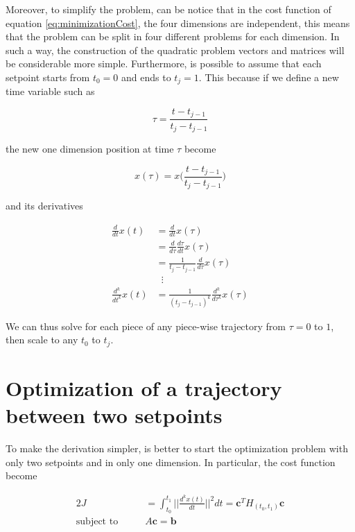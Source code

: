 \noindent Moreover, to simplify the problem, can be notice that in the cost function of equation \eqref{eq:minimizationCost}, the four dimensions are independent, this means that the problem can be split in four different problems for each dimension. In such a way, the construction of the quadratic problem vectors and matrices will be considerable more simple. Furthermore, is possible to assume that each setpoint starts from $t_0=0$ and ends to $t_j=1$. This because if we define a new time variable such as

\begin{equation}
	\tau = \frac{t-t_{j-1}}{t_j-t_{j-1}}
	\label{eq:simplyTime}
\end{equation}

\noindent the new one dimension position at time $\tau$ become

\begin{equation}
	x(\tau) = x\Big(\frac{t-t_{j-1}}{t_j-t_{j-1}}\Big)	
\end{equation}

\noindent and its derivatives

\begin{align*}
	\frac{d}{dt}x(t) &= \frac{d}{dt}x(\tau) \\
	&= \frac{d}{d\tau}\frac{d\tau}{dt}x(\tau) \\
	&= \frac{1}{t_j-t_{j-1}}\frac{d}{d\tau}x(\tau) \\
	&\hspace{7pt} \vdots \\
	\frac{d^k}{dt^k}x(t) &= \frac{1}{(t_j-t_{j-1})^k}\frac{d^k}{d\tau^k}x(\tau)
\end{align*}

\noindent We can thus solve for each piece of any piece-wise trajectory from $\tau=0$ to $1$, then scale to any $t_0$ to $t_j$.


\section{Optimization of a trajectory between two setpoints}

To make the derivation simpler, is better to start the optimization problem with only two setpoints and in only one dimension. In particular, the cost function become 

\begin{alignat}{2}
	J &= \int_{t_0}^{t_1}\Bigg|\Bigg|\frac{d^kx(t)}{dt}\Bigg|\Bigg|^2dt = \mathbf{c}^TH_{(t_0,t_1)}\mathbf{c} \\
	\text{subject to}\qquad & A\mathbf{c} = \mathbf{b} \nonumber
	\label{eq:oneSetpoint}
\end{alignat}

